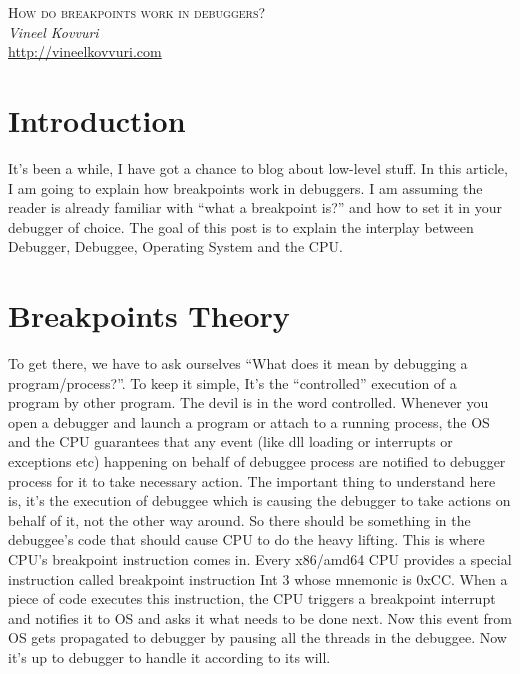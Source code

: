 \documentclass{article}
\begin{document}
\begin{titlepage}
   \begin{center}
      \Large\textsc{How do breakpoints work in debuggers?}\\
      \vspace{5mm}
      \Large\textit{Vineel Kovvuri}\\
      \url{http://vineelkovvuri.com}\\
   \end{center}
\end{titlepage}

\tableofcontents

\newpage
\section{Introduction}
It’s been a while, I have got a chance to blog about low-level stuff. In this article, I am going to explain how breakpoints work in debuggers. I am assuming the reader is already familiar with “what a breakpoint is?” and how to set it in your debugger of choice. The goal of this post is to explain the interplay between Debugger, Debuggee, Operating System and the CPU.

\section{Breakpoints Theory}
To get there, we have to ask ourselves  “What does it mean by debugging a program/process?”. To keep it simple, It’s the “controlled” execution of a program by other program. The devil is in the word controlled. Whenever you open a debugger and launch a program or attach to a running process, the OS and the CPU guarantees that any event (like dll loading or interrupts or exceptions etc) happening on behalf of debuggee process are notified to debugger process for it to take necessary action. The important thing to understand here is, it’s the execution of debuggee which is causing the debugger to take actions on behalf of it, not the other way around.  So there should be something in the debuggee’s code that should cause CPU to do the heavy lifting.  This is where CPU’s breakpoint instruction comes in. Every x86/amd64 CPU provides a special instruction called breakpoint instruction Int 3 whose mnemonic is 0xCC. When a piece of code executes this instruction, the CPU triggers a breakpoint interrupt and notifies it to OS and asks it what needs to be done next. Now this event from OS gets propagated to debugger by pausing all the threads in the debuggee. Now it’s up to debugger to handle it according to its will.
\end{document}
